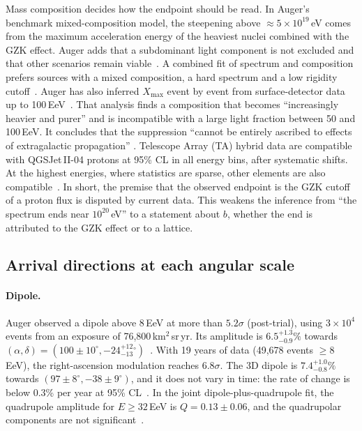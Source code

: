 Mass composition decides how the endpoint should be read. In Auger's benchmark
mixed-composition model, the steepening above $\approx5\times10^{19}$\,eV comes
from the maximum acceleration energy of the heaviest nuclei combined with the
GZK effect. Auger adds that a subdominant light component is not excluded and
that other scenarios remain viable~\cite{PierreAuger2020features}. A combined
fit of spectrum and composition prefers sources with a mixed composition, a
hard spectrum and a low rigidity cutoff~\cite{PierreAuger2023constraining}.
Auger has also inferred $X_{\max}$ event by event from surface-detector data up
to 100\,EeV~\cite{PierreAuger2025inference}. That analysis finds a composition
that becomes ``increasingly heavier and purer'' and is incompatible with a large
light fraction between 50 and 100\,EeV. It concludes that the suppression
``cannot be entirely ascribed to effects of extragalactic propagation''
\cite{PierreAuger2025inference}. Telescope Array (TA) hybrid data are
compatible with QGSJet\,II-04 protons at 95\% CL in all energy bins, after
systematic shifts. At the highest energies, where statistics are sparse, other
elements are also compatible~\cite{TelescopeArray2018depth}. In short, the
premise that the observed endpoint is the GZK cutoff of a proton flux is
disputed by current data. This weakens the inference from ``the spectrum ends
near $10^{20}$\,eV'' to a statement about $b$, whether the end is attributed to
the GZK effect or to a lattice.

\subsection{Arrival directions at each angular scale}
\label{sec:uhecr:anisotropy}

\paragraph{Dipole.}
Auger observed a dipole above 8\,EeV at more than $5.2\sigma$ (post-trial),
using $3\times10^4$ events from an exposure of 76{,}800\,km$^2$\,sr\,yr. Its
amplitude is $6.5^{+1.3}_{-0.9}\%$ towards $(\alpha,\delta)=(100\pm10^\circ,
-24^{+12}_{-13}{}^\circ)$~\cite{PierreAuger2017observation}. With 19 years of data
(49{,}678 events $\geq8$\,EeV), the right-ascension modulation reaches $6.8\sigma$.
The 3D dipole is $7.4^{+1.0}_{-0.8}\%$ towards
$(97\pm8^\circ,-38\pm9^\circ)$, and it does not vary in time: the rate of change
is below 0.3\% per year at 95\% CL~\cite{PierreAuger2024large}. In the joint
dipole-plus-quadrupole fit, the quadrupole amplitude for $E\geq32$\,EeV is
$Q=0.13\pm0.06$, and the quadrupolar components are not
significant~\cite{PierreAuger2024large}.

